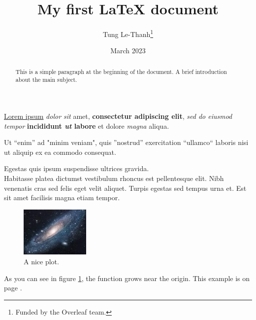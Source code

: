 \documentclass[12pt, letterpaper]{article}
\title{My first \LaTeX{} document}
\author{Tung Le-Thanh\thanks{Funded by the Overleaf team.}}
\date{March 2023}
\begin{document}
\maketitle %

\begin{abstract}
This is a simple paragraph at the beginning of the 
document. A brief introduction about the main subject.
\end{abstract}

\underline{Lorem ipsum} \textit{dolor sit} amet, 
\textbf{consectetur adipiscing elit}, %
\textit{sed do \emph{eiusmod} tempor}
\textbf{incididunt \emph{ut} labore} 
et dolore \emph{magna} aliqua. %

Ut ``enim'' ad %
"minim veniam", %
quis ''nostrud'' exercitation ``ullamco`` %
laboris nisi ut aliquip ex ea commodo consequat.

Egestas quis ipsum suspendisse ultrices gravida. \\ Habitasse platea dictumst vestibulum rhoncus est pellentesque elit. \newline Nibh venenatis cras sed felis eget velit aliquet. %
Turpis egestas sed tempus urna et. Est sit amet facilisis magna etiam tempor.

\begin{figure}[h]
    \centering
    \includegraphics[width=0.3\textwidth]{images/universe.jpg}
    \caption{A nice plot.}
    \label{fig:mesh1}
\end{figure}
As you can see in figure \ref{fig:mesh1}, the function grows near the origin. This example is on page \pageref{fig:mesh1}.

\newpage
\end{document}
